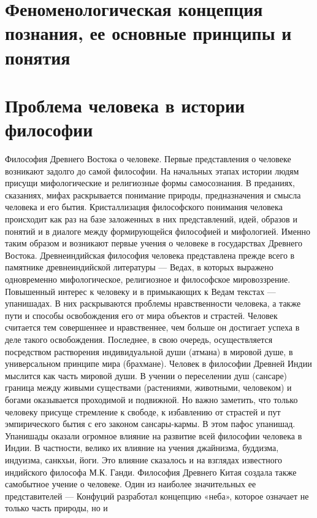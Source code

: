 \documentclass[12pt]{article}
\begin{document}
\newpage
\section{Феноменологическая концепция познания, ее основные принципы и понятия}


\newpage
\section{Проблема человека в истории философии}
Философия Древнего Востока о человеке.
Первые  представления о человеке  возникают задолго до  самой  философии.  На начальных этапах истории
людям  присущи  мифологические  и  религиозные  формы  самосознания.  В  преданиях,  сказаниях,  мифах
раскрывается  понимание  природы,  предназначения  и  смысла  человека  и  его  бытия.  Кристаллизация
философского понимания человека происходит как раз на базе заложенных в них представлений, идей, образов
и понятий и в диалоге между формирующейся философией и мифологией. Именно таким образом и возникают
первые учения о человеке в государствах Древнего Востока.
Древнеиндийская философия человека представлена прежде всего в памятнике древнеиндийской литературы —
Ведах,  в  которых  выражено  одновременно  мифологическое,  религиозное  и  философское  мировоззрение.
Повышенный интерес к человеку и в примыкающих к Ведам текстах — упанишадах. В них раскрываются
проблемы нравственности человека, а также пути и способы освобождения его от мира объектов и страстей.
Человек  считается  тем  совершеннее  и  нравственнее,  чем  больше  он  достигает  успеха  в  деле  такого 
освобождения. Последнее, в свою очередь, осуществляется посредством растворения индивидуальной души
(атмана) в мировой душе, в универсальном принципе мира (брахмане).
Человек  в  философии  Древней  Индии  мыслится  как  часть  мировой  души.  В  учении  о  переселении  душ
(сансаре)  граница  между  живыми  существами  (растениями,  животными,  человеком)  и  богами  оказывается
проходимой  и  подвижной.  Но  важно  заметить,  что  только  человеку  присуще  стремление  к  свободе,  к
избавлению от страстей и пут эмпирического бытия с его законом сансары-кармы. В этом пафос упанишад.
Упанишады оказали огромное влияние на развитие всей философии человека в Индии. В частности, велико их
влияние  на  учения  джайнизма,  буддизма,  индуизма,  санкхьи,  йоги.  Это  влияние  сказалось  и  на  взглядах
известного индийского философа М.К. Ганди.
Философия Древнего Китая создала также самобытное учение о человеке. Один из наиболее значительных ее
представителей — Конфуций разработал концепцию «неба», которое означает не только часть природы, но и
\end{document}
